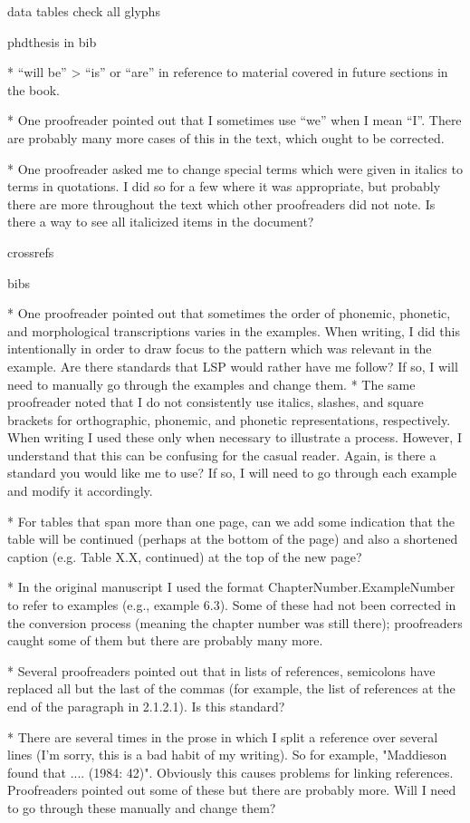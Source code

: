 data 
tables
check all glyphs  

phdthesis in bib
 
  
  *   “will be” > “is” or “are” in reference to material covered in future sections in the book.
 
  *   One proofreader pointed out that I sometimes use “we” when I mean “I”. There are probably many more cases of this in the text, which ought to be corrected.
  
  *   One proofreader asked me to change special terms which were given in italics to terms in quotations. I did so for a few where it was appropriate, but probably there are more throughout the text which other proofreaders did not note. Is there a way to see all italicized items in the document?
  
  crossrefs
  
  bibs
  
  
  
  *   One proofreader pointed out that sometimes the order of phonemic, phonetic, and morphological transcriptions varies in the examples. When writing, I did this intentionally in order to draw focus to the pattern which was relevant in the example. Are there standards that LSP would rather have me follow? If so, I will need to manually go through the examples and change them.
  *   The same proofreader noted that I do not consistently use italics, slashes, and square brackets for orthographic, phonemic, and phonetic representations, respectively. When writing I used these only when necessary to illustrate a process. However, I understand that this can be confusing for the casual reader. Again, is there a standard you would like me to use? If so, I will need to go through each example and modify it accordingly.
  
  
  *   For tables that span more than one page, can we add some indication that the table will be continued (perhaps at the bottom of the page) and also a shortened caption (e.g. Table X.X, continued) at the top of the new page? 
  
  *   In the original manuscript I used the format ChapterNumber.ExampleNumber to refer to examples (e.g., example 6.3). Some of these had not been corrected in the conversion process (meaning the chapter number was still there); proofreaders caught some of them but there are probably many more.
  
  *   Several proofreaders pointed out that in lists of references, semicolons have replaced all but the last of the commas (for example, the list of references at the end of the paragraph in 2.1.2.1). Is this standard?
   
  
  *   There are several times in the prose in which I split a reference over several lines (I'm sorry, this is a bad habit of my writing). So for example, "Maddieson found that .... (1984: 42)". Obviously this causes problems for linking references. Proofreaders pointed out some of these but there are probably more. Will I need to go through these manually and change them?

  
  
